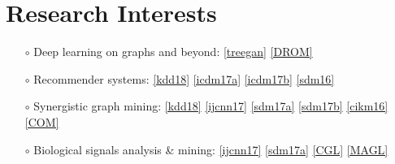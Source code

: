 \documentclass[a4paper,10pt]{article} %
\begin{document}
\section{Research Interests}
\begin{itemize}
\item[$\circ$] Deep learning on graphs and beyond:
\ref{treegan}
\ref{DROM}
\vspace{-0.25em}
\item[$\circ$] Recommender systems: 
\ref{kdd18}
\ref{icdm17a}
\ref{icdm17b}
\ref{sdm16}
\vspace{-0.25em}
\item[$\circ$] Synergistic graph mining: 
\ref{kdd18}
\ref{ijcnn17}
\ref{sdm17a}
\ref{sdm17b} 
\ref{cikm16} 
\ref{COM} 
\vspace{-0.25em}
\item[$\circ$] Biological signals analysis \& mining: 
\ref{ijcnn17}
\ref{sdm17a}
\ref{CGL}
\ref{MAGL}
\end{itemize}
\end{document}
